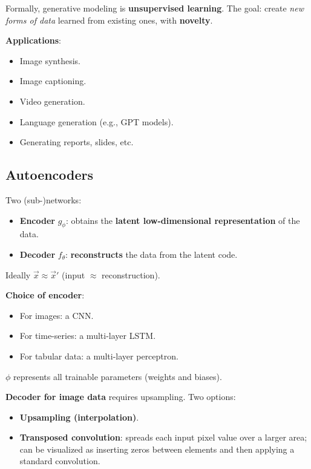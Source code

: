\documentclass[11pt,a4paper]{article}
\newcommand{\vx}{\vec{x}}
\begin{document}
Formally, generative modeling is \textbf{unsupervised learning}. The goal: create \emph{new forms of data} learned from existing ones, with \textbf{novelty}.

\textbf{Applications}:
\begin{itemize}[leftmargin=*]
    \item Image synthesis.
    \item Image captioning.
    \item Video generation.
    \item Language generation (e.g., GPT models).
    \item Generating reports, slides, etc.
\end{itemize}

\subsection{Autoencoders}

\begin{definitionbox}[title=Autoencoder]
Two (sub-)networks:
\begin{itemize}[leftmargin=*]
    \item \textbf{Encoder} $g_\phi$: obtains the \textbf{latent low-dimensional representation} of the data.
    \item \textbf{Decoder} $f_\theta$: \textbf{reconstructs} the data from the latent code.
\end{itemize}
Ideally $\vx \approx \vx'$ (input $\approx$ reconstruction).
\end{definitionbox}

\textbf{Choice of encoder}:
\begin{itemize}[leftmargin=*]
    \item For images: a CNN.
    \item For time-series: a multi-layer LSTM.
    \item For tabular data: a multi-layer perceptron.
\end{itemize}
$\phi$ represents all trainable parameters (weights and biases).

\textbf{Decoder for image data} requires upsampling. Two options:
\begin{itemize}[leftmargin=*]
    \item \textbf{Upsampling (interpolation)}.
    \item \textbf{Transposed convolution}: spreads each input pixel value over a larger area; can be visualized as inserting zeros between elements and then applying a standard convolution.
\end{itemize}
\end{document}
